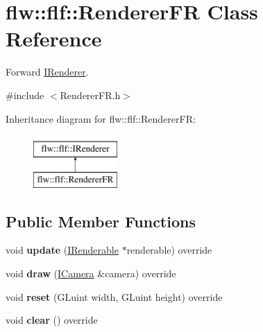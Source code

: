 \hypertarget{classflw_1_1flf_1_1RendererFR}{}\section{flw\+:\+:flf\+:\+:Renderer\+FR Class Reference}
\label{classflw_1_1flf_1_1RendererFR}


Forward \hyperlink{classflw_1_1flf_1_1IRenderer}{I\+Renderer}.  




{\ttfamily \#include $<$Renderer\+F\+R.\+h$>$}

Inheritance diagram for flw\+:\+:flf\+:\+:Renderer\+FR\+:\begin{figure}[H]
\begin{center}
\leavevmode
\includegraphics[height=2.000000cm]{classflw_1_1flf_1_1RendererFR}
\end{center}
\end{figure}
\subsection*{Public Member Functions}
\begin{DoxyCompactItemize}
\item 
void {\bfseries update} (\hyperlink{classflw_1_1flf_1_1IRenderable}{I\+Renderable} $\ast$renderable) override\hypertarget{classflw_1_1flf_1_1RendererFR_a773c729d0eb227ccb9d3ee22ce879922}{}\label{classflw_1_1flf_1_1RendererFR_a773c729d0eb227ccb9d3ee22ce879922}

\item 
void {\bfseries draw} (\hyperlink{classflw_1_1flf_1_1ICamera}{I\+Camera} \&camera) override\hypertarget{classflw_1_1flf_1_1RendererFR_a607600cb2090632d62f10ae78d3f474f}{}\label{classflw_1_1flf_1_1RendererFR_a607600cb2090632d62f10ae78d3f474f}

\item 
void {\bfseries reset} (G\+Luint width, G\+Luint height) override\hypertarget{classflw_1_1flf_1_1RendererFR_a1b001f7f804fe46d4ce0b1bebd649eeb}{}\label{classflw_1_1flf_1_1RendererFR_a1b001f7f804fe46d4ce0b1bebd649eeb}

\item 
void {\bfseries clear} () override\hypertarget{classflw_1_1flf_1_1RendererFR_a74c14e50b6e6477a7e9fb2e129cf2cf6}{}\label{classflw_1_1flf_1_1RendererFR_a74c14e50b6e6477a7e9fb2e129cf2cf6}

\end{DoxyCompactItemize}
